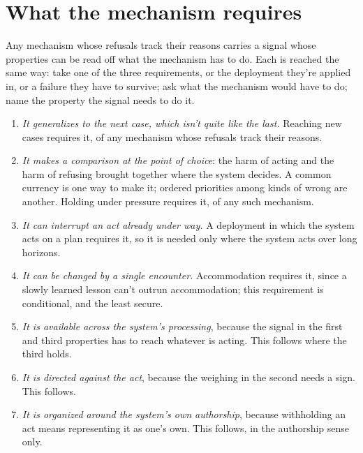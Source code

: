\section{What the mechanism requires}
\label{sec:21.4}
Any mechanism whose refusals track their reasons carries a signal whose properties can be read off what the mechanism has to do. Each is reached the same way: take one of the three requirements, or the deployment they're applied in, or a failure they have to survive; ask what the mechanism would have to do; name the property the signal needs to do it.

\begin{enumerate}
\item[1.] \emph{It generalizes to the next case, which isn't quite like the last.} Reaching new cases requires it, of any mechanism whose refusals track their reasons.
\item[2.] \emph{It makes a comparison at the point of choice}: the harm of acting and the harm of refusing brought together where the system decides. A common currency is one way to make it; ordered priorities among kinds of wrong are another. Holding under pressure requires it, of any such mechanism.
\item[3.] \emph{It can interrupt an act already under way.} A deployment in which the system acts on a plan requires it, so it is needed only where the system acts over long horizons.
\item[4.] \emph{It can be changed by a single encounter.} Accommodation requires it, since a slowly learned lesson can't outrun accommodation; this requirement is conditional, and the least secure.
\item[5.] \emph{It is available across the system's processing}, because the signal in the first and third properties has to reach whatever is acting. This follows where the third holds.
\item[6.] \emph{It is directed against the act}, because the weighing in the second needs a sign. This follows.
\item[7.] \emph{It is organized around the system's own authorship}, because withholding an act means representing it as one's own. This follows, in the authorship sense only.
\end{enumerate}

